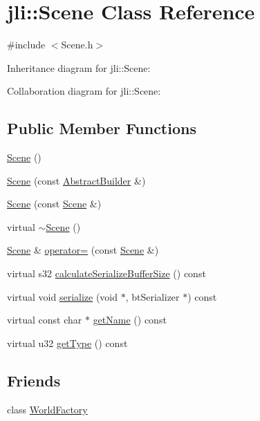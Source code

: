 \hypertarget{classjli_1_1_scene}{\section{jli\+:\+:Scene Class Reference}
\label{classjli_1_1_scene}
}


{\ttfamily \#include $<$Scene.\+h$>$}



Inheritance diagram for jli\+:\+:Scene\+:


Collaboration diagram for jli\+:\+:Scene\+:
\subsection*{Public Member Functions}
\begin{DoxyCompactItemize}
\item 
\hyperlink{classjli_1_1_scene_abef8701bc66efaecdfb9b759f7523e9d}{Scene} ()
\item 
\hyperlink{classjli_1_1_scene_afbad74f1983633db64663db362041720}{Scene} (const \hyperlink{classjli_1_1_abstract_builder}{Abstract\+Builder} \&)
\item 
\hyperlink{classjli_1_1_scene_a4e0a2f2e6f43f3cf5e866f662dfa011a}{Scene} (const \hyperlink{classjli_1_1_scene}{Scene} \&)
\item 
virtual \hyperlink{classjli_1_1_scene_a59998f54275bafbf74434f6954f9cd2e}{$\sim$\+Scene} ()
\item 
\hyperlink{classjli_1_1_scene}{Scene} \& \hyperlink{classjli_1_1_scene_ad7e5d257a4818d182f41a82ef7347f46}{operator=} (const \hyperlink{classjli_1_1_scene}{Scene} \&)
\item 
virtual s32 \hyperlink{classjli_1_1_scene_aee7b83497bc690c184b3381f30ffd565}{calculate\+Serialize\+Buffer\+Size} () const 
\item 
virtual void \hyperlink{classjli_1_1_scene_a5cf4bf5f66daa0d35fc91eb42a9242d2}{serialize} (void $\ast$, bt\+Serializer $\ast$) const 
\item 
virtual const char $\ast$ \hyperlink{classjli_1_1_scene_a6405f60cf27b222e0d41bf161340bef7}{get\+Name} () const 
\item 
virtual u32 \hyperlink{classjli_1_1_scene_a950da1ba38b5f3973362b3225e4f3baf}{get\+Type} () const 
\end{DoxyCompactItemize}
\subsection*{Friends}
\begin{DoxyCompactItemize}
\item 
class \hyperlink{classjli_1_1_scene_acb96ebb09abe8f2a37a915a842babfac}{World\+Factory}
\end{DoxyCompactItemize}


